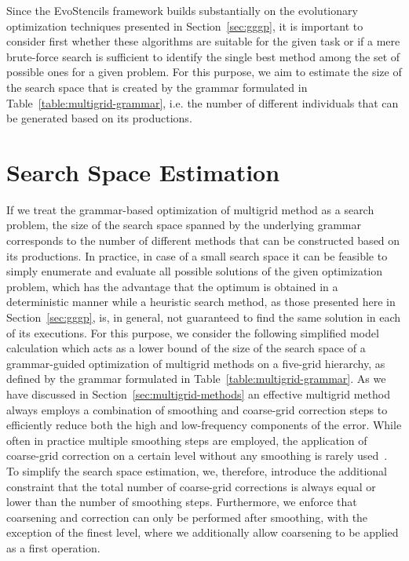 Since the EvoStencils framework builds substantially on the evolutionary optimization techniques presented in Section~\ref{sec:gggp}, it is important to consider first whether these algorithms are suitable for the given task or if a mere brute-force search is sufficient to identify the single best method among the set of possible ones for a given problem.
For this purpose, we aim to estimate the size of the search space that is created by the grammar formulated in Table~\ref{table:multigrid-grammar}, i.e. the number of different individuals that can be generated based on its productions.

\section{Search Space Estimation}
If we treat the grammar-based optimization of multigrid method as a search problem, the size of the search space spanned by the underlying grammar corresponds to the number of different methods that can be constructed based on its productions.
In practice, in case of a small search space it can be feasible to simply enumerate and evaluate all possible solutions of the given optimization problem, which has the advantage that the optimum is obtained in a deterministic manner while a heuristic search method, as those presented here in Section~\ref{sec:gggp}, is, in general, not guaranteed to find the same solution in each of its executions.
For this purpose, we consider the following simplified model calculation which acts as a lower bound of the size of the search space of a grammar-guided optimization of multigrid methods on a five-grid hierarchy, as defined by the grammar formulated in Table~\ref{table:multigrid-grammar}. 
As we have discussed in Section~\ref{sec:multigrid-methods} an effective multigrid method always employs a combination of smoothing and coarse-grid correction steps to efficiently reduce both the high and low-frequency components of the error.
While often in practice multiple smoothing steps are employed, the application of coarse-grid correction on a certain level without any smoothing is rarely used~\cite{trottenberg2000multigrid}.
To simplify the search space estimation, we, therefore, introduce the additional constraint that the total number of coarse-grid corrections is always equal or lower than the number of smoothing steps.
Furthermore, we enforce that coarsening and correction can only be performed after smoothing, with the exception of the finest level, where we additionally allow coarsening to be applied as a first operation.
